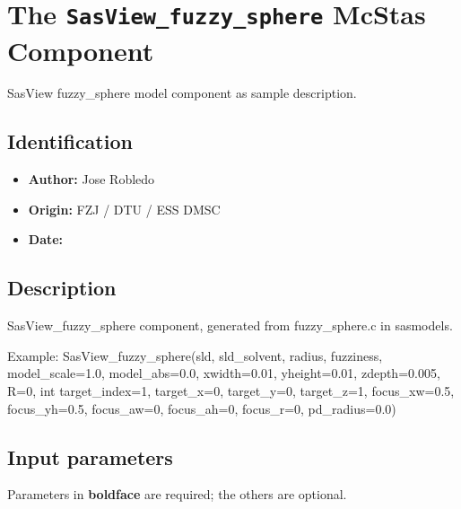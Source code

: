 \section{The \texttt{SasView\_fuzzy\_sphere} McStas Component}
SasView fuzzy\_sphere model component as sample description.

\subsection*{Identification}
\begin{itemize}
  \item \textbf{Author:} Jose Robledo
  \item \textbf{Origin:} FZJ / DTU / ESS DMSC
  \item \textbf{Date:} 
\end{itemize}

\subsection*{Description}
SasView\_fuzzy\_sphere component, generated from fuzzy\_sphere.c in sasmodels.

Example: SasView\_fuzzy\_sphere(sld, sld\_solvent, radius, fuzziness, model\_scale=1.0, model\_abs=0.0, xwidth=0.01, yheight=0.01, zdepth=0.005, R=0, int target\_index=1, target\_x=0, target\_y=0, target\_z=1, focus\_xw=0.5, focus\_yh=0.5, focus\_aw=0, focus\_ah=0, focus\_r=0, pd\_radius=0.0)

\subsection*{Input parameters}
Parameters in \textbf{boldface} are required; the others are optional.

